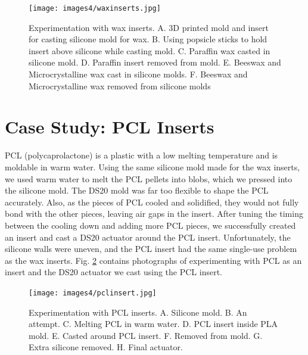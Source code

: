 \begin{figure}[h]
    \centering
    \texttt{[image: images4/waxinserts.jpg]}
    \caption{Experimentation with wax inserts. A. 3D printed mold and insert for casting silicone mold for wax. B. Using popsicle sticks to hold insert above silicone while casting mold. C. Paraffin wax casted in silicone mold. D. Paraffin insert removed from mold. E. Beeswax and Microcrystalline wax cast in silicone molds. F. Beeswax and Microcrystalline wax removed from silicone molds}
    \label{fig:waxinserts}
\end{figure}

\clearpage
\section{Case Study: PCL Inserts}
PCL (polycaprolactone) is a plastic with a low melting temperature and is moldable in warm water. Using the same silicone mold made for the wax inserts, we used warm water to melt the PCL pellets into blobs, which we pressed into the silicone mold. The DS20 mold was far too flexible to shape the PCL accurately. Also, as the pieces of PCL cooled and solidified, they would not fully bond with the other pieces, leaving air gaps in the insert. After tuning the timing between the cooling down and adding more PCL pieces, we successfully created an insert and cast a DS20 actuator around the PCL insert. Unfortunately, the silicone walls were uneven, and the PCL insert had the same single-use problem as the wax inserts. Fig. \ref{fig:pclinsert} contains photographs of experimenting with PCL as an insert and the DS20 actuator we cast using the PCL insert.

\begin{figure}[h]
    \centering
    \texttt{[image: images4/pclinsert.jpg]}
    \caption{Experimentation with PCL inserts. A. Silicone mold. B. An attempt. C. Melting PCL in warm water. D. PCL insert inside PLA mold. E. Casted around PCL insert. F. Removed from mold. G. Extra silicone removed. H. Final actuator.}
    \label{fig:pclinsert}
\end{figure}

\clearpage
